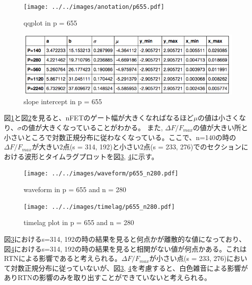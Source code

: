 \documentclass{jsarticle}
\begin{document}
\begin{figure}[hbtp]
	\centering
	\texttt{[image: ../../images/anotation/p655.pdf]}
	\caption{qqplot in p = 655}
	\label{fig:qqplot_in_p_655}
\end{figure}

\begin{figure}[hbtp]
	\centering
	\includegraphics[width=13cm]{../../least_squares/p655.png}
	\caption{slope intercept in p = 655}
	\label{fig:slope_intercept_in_p_655}
\end{figure}

図\ref{fig:qqplot_in_p_655}と図\ref{fig:slope_intercept_in_p_655}を見ると、nFETのゲート幅が大きくなればなるほど$\mu$の値は小さくなり、$\sigma$の値が大きくなっていることがわかる。 また, $\Delta F / F_{max}$の値が大きい所と小さいところで対数正規分布に従わなくなっている。ここで、n=140の時の$\Delta F / F_{max}$が大きい2点(s = 314, 192)と小さい2点(s = 233, 276)でのセクションにおける波形とタイムラグプロットを図\ref{fig:waveform_in_p_655_n_280}, \ref{fig:timelag_in_p_655_n_280}に示す。

\begin{figure}[hbtp]
	\centering
	\texttt{[image: ../../images/waveform/p655\_n280.pdf]}
	\caption{waveform in p = 655 and n = 280}
	\label{fig:waveform_in_p_655_n_280}
\end{figure}

\begin{figure}[hbtp]
	\centering
	\texttt{[image: ../../images/timelag/p655\_n280.pdf]}
	\caption{timelag plot in p = 655 and n = 280}
	\label{fig:timelag_in_p_655_n_280}
\end{figure}

図\ref{fig:waveform_in_p_655_n_280}におけるs=314, 192の時の結果を見ると何点かが離散的な値になっており、図\ref{fig:timelag_in_p_655_n_280}におけるs=314, 192の時の結果を見ると相関がない値が何点かある。これはRTNによる影響であると考えられる。$\Delta F / F_{max}$が小さい点(s = 233, 276)において対数正規分布に従っていないが、図\ref{fig:waveform_in_p_655_n_280}, \ref{fig:timelag_in_p_655_n_280}を考慮すると、白色雑音による影響がありRTNの影響のみを取り出すことができていないと考えられる。
\end{document}
